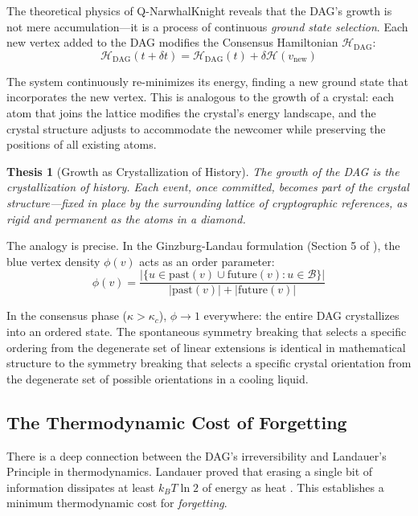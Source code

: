 \documentclass[12pt,a4paper]{article}
\theoremstyle{philosophical}
\newtheorem{thesis}{Thesis}
\begin{document}
The theoretical physics of Q-NarwhalKnight reveals that the DAG's growth is not mere accumulation---it is a process of continuous \emph{ground state selection}. Each new vertex added to the DAG modifies the Consensus Hamiltonian $\mathcal{H}_{\mathrm{DAG}}$:
\begin{equation}
\mathcal{H}_{\mathrm{DAG}}(t+\delta t) = \mathcal{H}_{\mathrm{DAG}}(t) + \delta \mathcal{H}(v_{\mathrm{new}})
\end{equation}

The system continuously re-minimizes its energy, finding a new ground state that incorporates the new vertex. This is analogous to the growth of a crystal: each atom that joins the lattice modifies the crystal's energy landscape, and the crystal structure adjusts to accommodate the newcomer while preserving the positions of all existing atoms.

\begin{thesis}[Growth as Crystallization of History]
\label{thesis:crystal}
The growth of the DAG is the crystallization of history. Each event, once committed, becomes part of the crystal structure---fixed in place by the surrounding lattice of cryptographic references, as rigid and permanent as the atoms in a diamond.
\end{thesis}

The analogy is precise. In the Ginzburg-Landau formulation (Section 5 of \cite{qnk-physics}), the blue vertex density $\phi(v)$ acts as an order parameter:
\begin{equation}
\phi(v) = \frac{|\{u \in \mathrm{past}(v) \cup \mathrm{future}(v) : u \in \mathcal{B}\}|}{|\mathrm{past}(v)| + |\mathrm{future}(v)|}
\end{equation}

In the consensus phase ($\kappa > \kappa_c$), $\phi \to 1$ everywhere: the entire DAG crystallizes into an ordered state. The spontaneous symmetry breaking that selects a specific ordering from the degenerate set of linear extensions is identical in mathematical structure to the symmetry breaking that selects a specific crystal orientation from the degenerate set of possible orientations in a cooling liquid.

\subsection{The Thermodynamic Cost of Forgetting}

There is a deep connection between the DAG's irreversibility and Landauer's Principle in thermodynamics. Landauer proved that erasing a single bit of information dissipates at least $k_B T \ln 2$ of energy as heat \cite{landauer}. This establishes a minimum thermodynamic cost for \emph{forgetting}.
\end{document}
